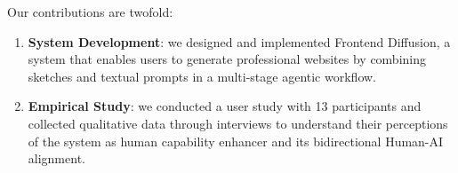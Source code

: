 Our contributions are twofold:  

\begin{enumerate}
\item \textbf{System Development}: we designed and implemented Frontend Diffusion, a system that enables users to generate professional websites by combining sketches and textual prompts in a multi-stage agentic workflow.
\item \textbf{Empirical Study}: we conducted a user study with 13 participants and collected qualitative data through interviews to understand their perceptions of the system as human capability enhancer and its bidirectional Human-AI alignment.
\end{enumerate}